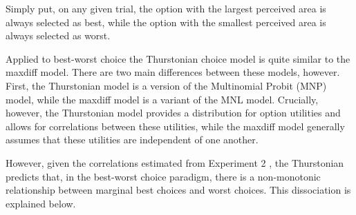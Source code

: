 Simply put, on any given trial, the option with the largest perceived area is always selected as best, while the option with the smallest perceived area is always selected as worst. 

Applied to best-worst choice the Thurstonian choice model is quite similar to the maxdiff model. There are two main differences between these models, however. First, the Thurstonian model is a version of the Multinomial Probit (MNP) model, while the maxdiff model is a variant of the MNL model. Crucially, however, the Thurstonian model provides a distribution for option utilities and allows for correlations between these utilities, while the maxdiff model generally assumes that these utilities are independent of one another. 

However, given the correlations estimated from Experiment 2 , the Thurstonian predicts that, in the best-worst choice paradigm, there is a non-monotonic relationship between marginal best choices and worst choices. This dissociation is explained below.


